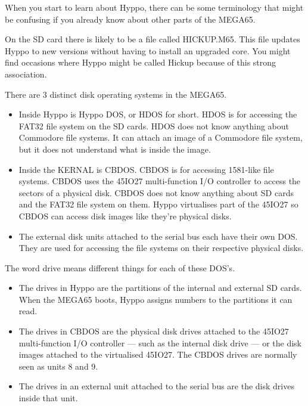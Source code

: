 When you start to learn about Hyppo, there can be some terminology that might be
confusing if you already know about other parts of the MEGA65.

On the SD card there is likely to be a file called HICKUP.M65. This file updates
Hyppo to new versions without having to install an upgraded core. You might find
occasions where Hyppo might be called Hickup because of this strong association.

There are 3 distinct disk operating systems in the MEGA65.

\begin{itemize}
  \item Inside Hyppo is Hyppo DOS, or HDOS for short. HDOS is for accessing
        the FAT32 file system on the SD cards. HDOS does not know anything
        about Commodore file systems. It can attach an image of a Commodore
        file system, but it does not understand what is inside the image.
  \item Inside the KERNAL is CBDOS. CBDOS is for accessing 1581-like file
        systems. CBDOS uses the 45IO27 multi-function I/O controller to access
        the sectors of a physical disk. CBDOS does not know anything about SD
        cards and the FAT32 file system on them. Hyppo virtualises part of the
        45IO27 so CBDOS can access disk images like they're physical disks.
  \item The external disk units attached to the serial bus each have their own
        DOS. They are used for accessing the file systems on their respective
        physical disks.
\end{itemize}

The word drive means different things for each of these DOS's.

\begin{itemize}
  \item The drives in Hyppo are the partitions of the internal and external SD
        cards. When the MEGA65 boots, Hyppo assigns numbers to the partitions
        it can read.
  \item The drives in CBDOS are the physical disk drives attached to the 45IO27
        multi-function I/O controller --- such as the internal disk drive ---
        or the disk images attached to the virtualised 45IO27. The CBDOS drives
        are normally seen as units 8 and 9.
  \item The drives in an external unit attached to the serial bus are the
        disk drives inside that unit.
\end{itemize}

